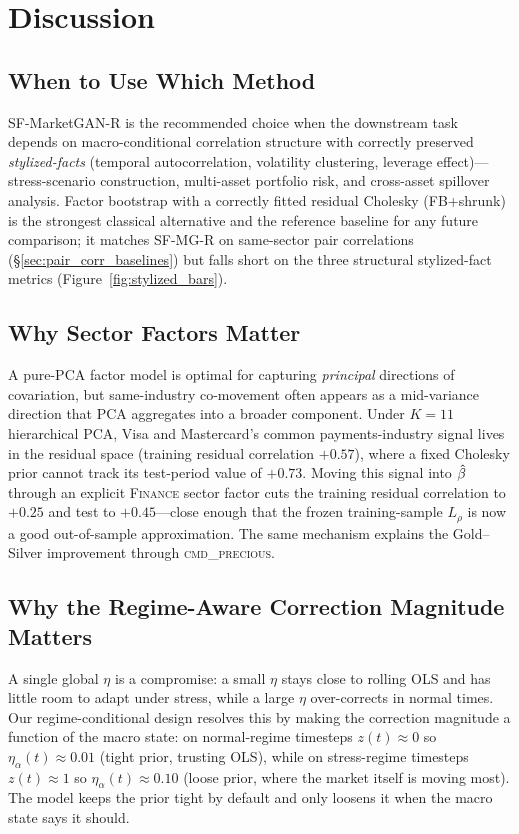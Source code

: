\section{Discussion}
\label{sec:discussion}

\subsection{When to Use Which Method}

SF-MarketGAN-R is the recommended choice when the downstream task depends on macro-conditional correlation structure with correctly preserved \emph{stylized-facts} (temporal autocorrelation, volatility clustering, leverage effect)---stress-scenario construction, multi-asset portfolio risk, and cross-asset spillover analysis. Factor bootstrap with a correctly fitted residual Cholesky (FB+shrunk) is the strongest classical alternative and the reference baseline for any future comparison; it matches SF-MG-R on same-sector pair correlations (\S\ref{sec:pair_corr_baselines}) but falls short on the three structural stylized-fact metrics (Figure~\ref{fig:stylized_bars}).

\subsection{Why Sector Factors Matter}

A pure-PCA factor model is optimal for capturing \emph{principal} directions of covariation, but same-industry co-movement often appears as a mid-variance direction that PCA aggregates into a broader component. Under $K=11$ hierarchical PCA, Visa and Mastercard's common payments-industry signal lives in the residual space (training residual correlation $+0.57$), where a fixed Cholesky prior cannot track its test-period value of $+0.73$. Moving this signal into $\hat{\beta}$ through an explicit \textsc{Finance} sector factor cuts the training residual correlation to $+0.25$ and test to $+0.45$---close enough that the frozen training-sample $L_\rho$ is now a good out-of-sample approximation. The same mechanism explains the Gold--Silver improvement through \textsc{cmd\_precious}.

\subsection{Why the Regime-Aware Correction Magnitude Matters}

A single global $\eta$ is a compromise: a small $\eta$ stays close to rolling OLS and has little room to adapt under stress, while a large $\eta$ over-corrects in normal times. Our regime-conditional design resolves this by making the correction magnitude a function of the macro state: on normal-regime timesteps $z(t) \approx 0$ so $\eta_\alpha(t) \approx 0.01$ (tight prior, trusting OLS), while on stress-regime timesteps $z(t) \approx 1$ so $\eta_\alpha(t) \approx 0.10$ (loose prior, where the market itself is moving most). The model keeps the prior tight by default and only loosens it when the macro state says it should.

